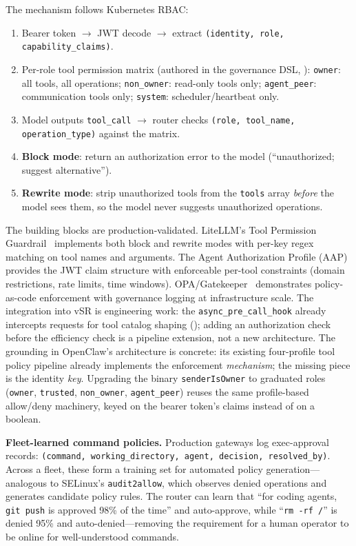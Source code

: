 \begin{opportunity}
The mechanism follows Kubernetes RBAC:
\begin{enumerate}[nosep]
  \item Bearer token $\to$ JWT decode $\to$ extract
        \texttt{(identity, role, capability\_claims)}.
  \item Per-role tool permission matrix (authored in the governance
        DSL, ):
        \texttt{owner}: all tools, all operations;
        \texttt{non\_owner}: read-only tools only;
        \texttt{agent\_peer}: communication tools only;
        \texttt{system}: scheduler/heartbeat only.
  \item Model outputs \texttt{tool\_call} $\to$ router checks
        \texttt{(role, tool\_name, operation\_type)} against the matrix.
  \item \textbf{Block mode}: return an authorization error to the
        model (``unauthorized; suggest alternative'').
  \item \textbf{Rewrite mode}: strip unauthorized tools from the
        \texttt{tools} array \emph{before} the model sees them, so the
        model never suggests unauthorized operations.
\end{enumerate}

\begin{frisk}
The building blocks are production-validated.  LiteLLM's Tool
Permission Guardrail~\cite{litellm2026toolguard} implements both
block and rewrite modes with per-key regex matching on tool names
and arguments.  The Agent Authorization Profile
(AAP)~\cite{aap2026} provides the JWT claim structure with
enforceable per-tool constraints (domain restrictions, rate limits,
time windows).  OPA/Gatekeeper~\cite{openpolicyagent} demonstrates
policy-as-code enforcement with governance logging at infrastructure
scale.  The integration into vSR is engineering work: the
\texttt{async\_pre\_call\_hook} already intercepts requests for tool
catalog shaping (); adding an authorization
check before the efficiency check is a pipeline extension, not a new
architecture.  The grounding in OpenClaw's architecture is concrete:
its existing four-profile tool policy pipeline already implements the
enforcement \emph{mechanism}; the missing piece is the identity
\emph{key}.  Upgrading the binary \texttt{senderIsOwner} to
graduated roles (\texttt{owner}, \texttt{trusted}, \texttt{non\_owner},
\texttt{agent\_peer}) reuses the same profile-based allow/deny
machinery, keyed on the bearer token's claims instead of on a
boolean.

\textbf{Fleet-learned command policies.}  Production gateways log
exec-approval records: \texttt{(command, working\_directory, agent,
decision, resolved\_by)}.  Across a fleet, these form a training set
for automated policy generation---analogous to SELinux's
\texttt{audit2allow}, which observes denied operations and generates
candidate policy rules.  The router can learn that ``for coding
agents, \texttt{git push} is approved 98\% of the time'' and
auto-approve, while ``\texttt{rm -rf /}'' is denied 95\% and
auto-denied---removing the requirement for a human operator to be
online for well-understood commands.


\end{frisk}
\end{opportunity}
